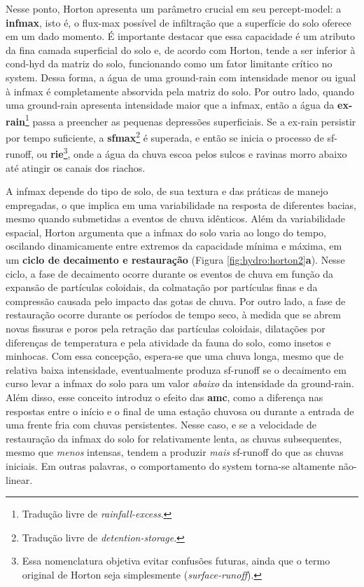 \documentclass[./main.tex]{subfiles}
\begin{document}
\par Nesse ponto, Horton apresenta um parâmetro crucial em seu \gls{percept-model}: a \textbf{\gls{infmax}}, isto é, o \gls{flux-max} possível de infiltração que a superfície do solo oferece em um dado momento. É importante destacar que essa capacidade é um atributo da fina camada superficial do solo e, de acordo com Horton, tende a ser inferior à \gls{cond-hyd} da matriz do solo, funcionando como um fator limitante crítico no \gls{system}. Dessa forma, a água de uma \gls{ground-rain} com intensidade menor ou igual à \gls{infmax} é completamente absorvida pela matriz do solo. Por outro lado, quando uma \gls{ground-rain} apresenta intensidade maior que a \gls{infmax}, então a água da \textbf{\gls{ex-rain}}\footnote{Tradução livre de \textit{rainfall-excess}.} passa a preencher as pequenas depressões superficiais. Se a \gls{ex-rain} persistir por tempo suficiente, a \textbf{\gls{sfmax}}\footnote{Tradução livre de \textit{detention-storage}.} é superada, e então se inicia o processo de \gls{sf-runoff}, ou \textbf{\gls{rie}}\footnote{Essa nomenclatura objetiva evitar confusões futuras, ainda que o termo original de Horton seja simplesmente  (\textit{surface-runoff}).}, onde a água da chuva escoa pelos sulcos e ravinas morro abaixo até atingir os canais dos riachos. 

\par A \gls{infmax} depende do tipo de solo, de sua textura e das práticas de manejo empregadas, o que implica em uma variabilidade na resposta de diferentes bacias, mesmo quando submetidas a eventos de chuva idênticos. Além da variabilidade espacial, Horton argumenta que a \gls{infmax} do solo varia ao longo do tempo, oscilando dinamicamente entre extremos da capacidade mínima e máxima, em um \textbf{ciclo de decaimento e restauração} (Figura \ref{fig:hydro:horton2}\textbf{a}). Nesse ciclo, a fase de decaimento ocorre durante os eventos de chuva em função da expansão de partículas coloidais, da colmatação por partículas finas e da compressão causada pelo impacto das gotas de chuva. Por outro lado, a fase de restauração ocorre durante os períodos de tempo seco, à medida que se abrem novas fissuras e poros pela retração das partículas coloidais, dilatações por diferenças de temperatura e pela atividade da fauna do solo, como insetos e minhocas. Com essa concepção, espera-se que uma chuva longa, mesmo que de relativa baixa intensidade, eventualmente produza \gls{sf-runoff} se o decaimento em curso levar a \gls{infmax} do solo para um valor \textit{abaixo} da intensidade da \gls{ground-rain}. Além disso, esse conceito introduz o efeito das \textbf{\gls{amc}}, como a diferença nas respostas entre o início e o final de uma estação chuvosa ou durante a entrada de uma frente fria com chuvas persistentes. Nesse caso, e se a velocidade de restauração da \gls{infmax} do solo for relativamente lenta, as chuvas subsequentes, mesmo que \textit{menos} intensas, tendem a produzir \textit{mais} \gls{sf-runoff} do que as chuvas iniciais. Em outras palavras, o comportamento do \gls{system} torna-se altamente não-linear.
\end{document}
